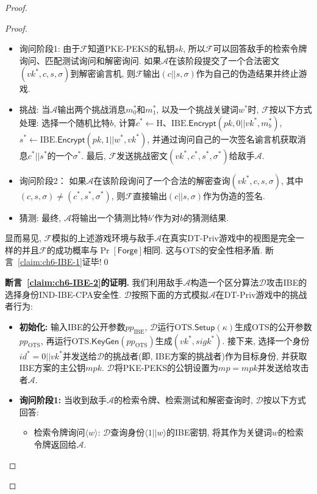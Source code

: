 \begin{proof}
\begin{proof}
\begin{trivlist}
\begin{itemize}
\item 询问阶段1: 由于$\mathcal{F}$知道PKE-PEKS的私钥$sk$, 所以$\mathcal{F}$可以回答敌手的检索令牌询问、匹配测试询问和解密询问. 如果$\mathcal{A}$在该阶段提交了一个合法密文$(vk^*, c, s, \sigma)$到解密谕言机, 则$\mathcal{F}$输出$(c||s, \sigma)$作为自己的伪造结果并终止游戏. 

\item 挑战: 当$\mathcal{A}$输出两个挑战消息$m_0^*$和$m_1^*$, 以及一个挑战关键词$w^*$时, $\mathcal{F}$按以下方式处理: 选择一个随机比特$b$, 计算$c^* \leftarrow \text{H、IBE}.\mathsf{Encrypt}(pk, 0||vk^*, m_b^*)$, 
$s^* \leftarrow \text{IBE}.\mathsf{Encrypt}(pk, 1||w^*, vk^*)$, 并通过询问自己的一次签名谕言机获取消息$c^*||s^*$的一个$\sigma^*$. 最后, $\mathcal{F}$发送挑战密文$(vk^*, c^*, s^*, \sigma^*)$给敌手$\mathcal{A}$. 

\item 询问阶段2： 如果$\mathcal{A}$在该阶段询问了一个合法的解密查询$(vk^*, c, s, \sigma)$, 其中$(c, s, \sigma) \neq (c^*, s^*, \sigma^*)$, 则$\mathcal{F}$直接输出$(c||s, \sigma)$作为伪造的签名. 

\item 猜测: 最终, $\mathcal{A}$将输出一个猜测比特$b'$作为对$b$的猜测结果.
\end{itemize}

显而易见, $\mathcal{F}$模拟的上述游戏环境与敌手$\mathcal{A}$在真实DT-Priv游戏中的视图是完全一样的并且$\mathcal{F}$的成功概率与$\Pr[\mathsf{Forge}]$相同. 这与OTS的安全性相矛盾. 断言~\ref{claim:ch6-IBE-1}证毕!\qed 
\end{trivlist}

\begin{trivlist} \itemsep 1pt \parskip 0pt \parsep 0pt
	\item \textbf{断言~\ref{claim:ch6-IBE-2}的证明.} 我们利用敌手$\mathcal{A}$构造一个区分算法$\mathcal{D}$攻击IBE的选择身份IND-IBE-CPA安全性. $\mathcal{D}$按照下面的方式模拟$\mathcal{A}$在DT-Priv游戏中的挑战者行为:
\begin{itemize}
	\item \textbf{初始化:} 输入IBE的公开参数$pp_{\text{IBE}}$, $\mathcal{D}$运行$\text{OTS}.\mathsf{Setup}(\kappa)$生成OTS的公开参数$pp_{\text{OTS}}$, 再运行$\text{OTS}.\mathsf{KeyGen}(pp_{\text{OTS}})$生成$(vk^*, sigk^*)$. 接下来, 选择一个身份$id^* = 0||vk^*$并发送给$\mathcal{D}$的挑战者(即, IBE方案的挑战者)作为目标身份, 并获取IBE方案的主公钥$mpk$. $\mathcal{D}$将PKE-PEKS的公钥设置为$mp = mpk$并发送给攻击者$\mathcal{A}$.

	\item \textbf{询问阶段1:} 当收到敌手$\mathcal{A}$的检索令牌、检索测试和解密查询时, $\mathcal{D}$按以下方式回答:\vspace{-0.5em}
		\begin{itemize} \itemsep 1pt \parskip 0pt \parsep 0pt
			\item 检索令牌询问$\langle w \rangle$: $\mathcal{D}$查询身份$\langle 1||w \rangle$的IBE密钥, 将其作为关键词$w$的检索令牌返回给$\mathcal{A}$.


\end{itemize}
\end{itemize}
\end{trivlist}
\end{proof}
\end{proof}
